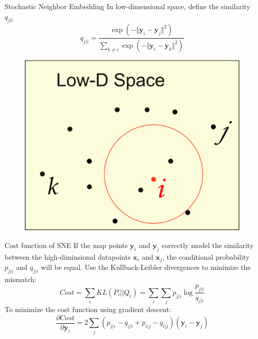 \documentclass[10pt]{beamer}
\newcommand{\bol}[1]{\textbf{#1}}
\begin{document}
\begin{frame}{Stochastic Neighbor Embedding}
In low-dimensional space, define the similarity $q_{j|i}$
\begin{displaymath}
	q_{j|i} = \frac{\exp{(-\Vert\bol{y}_i - \bol{y}_j\Vert^2)}}{\sum_{k \neq i}\exp(-\Vert\bol{y}_i - \bol{y}_k\Vert^2)}
\end{displaymath}
\begin{figure}
\centering
\includegraphics[scale=0.2]{./image/ld.eps}
\end{figure}
\end{frame}


\begin{frame}{Cost function of SNE}
If the map points $\bol{y}_i$ and $\bol{y}_j$ correctly model the similarity between the high-diminsional datapoints $\bol{x}_i$ and $\bol{x}_j$, the conditional probability $p_{j|i}$ and $q_{j|i}$ will be equal. Use the Kullback-Leibler divergences to minimize the mismatch:
\begin{displaymath}
	Cost = \sum_i KL(P_i||Q_i) = \sum_i\sum_j p_{j|i} \log\frac{p_{j|i}}{q_{j|i}}
\end{displaymath}
To minimize the cost function using gradient descent:
\begin{displaymath}
	\frac{\partial Cost}{\partial \bol{y}_i} = 2\sum_j (p_{j|i} - q_{j|i} + p_{i|j} - q_{i|j})(\bol{y}_i - \bol{y}_j)
\end{displaymath}
\end{frame}
\end{document}
